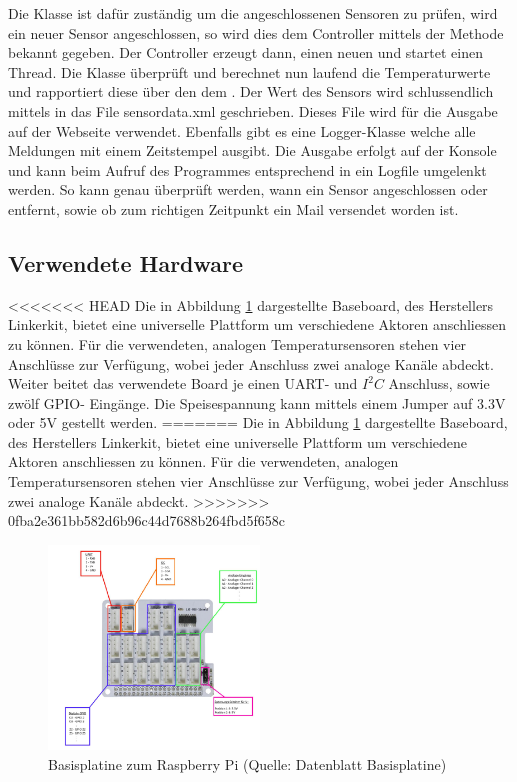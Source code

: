 Die Klasse  ist dafür zuständig um die angeschlossenen Sensoren zu prüfen, wird ein neuer Sensor angeschlossen, so wird dies dem Controller mittels der Methode  bekannt gegeben. Der Controller erzeugt dann, einen neuen  und startet einen Thread. Die Klasse  überprüft und berechnet nun laufend die Temperaturwerte und rapportiert diese über den  dem . Der Wert des Sensors wird schlussendlich mittels  in das File sensordata.xml geschrieben. Dieses File wird für die Ausgabe auf der Webseite verwendet.
Ebenfalls gibt es eine Logger-Klasse welche alle Meldungen mit einem Zeitstempel ausgibt. Die Ausgabe erfolgt auf der Konsole und kann beim Aufruf des Programmes entsprechend in ein Logfile umgelenkt werden. So kann genau überprüft werden, wann ein Sensor angeschlossen oder entfernt, sowie ob zum richtigen Zeitpunkt ein Mail versendet worden ist. 

\subsection{Verwendete Hardware}

<<<<<<< HEAD
Die in Abbildung \ref{fig:plate} dargestellte Baseboard, des Herstellers Linkerkit, bietet eine universelle Plattform um verschiedene Aktoren anschliessen zu können. Für die verwendeten, analogen Temperatursensoren stehen vier Anschlüsse zur Verfügung, wobei jeder Anschluss zwei analoge Kanäle abdeckt. Weiter beitet das verwendete Board je einen UART- und $I^2C$ Anschluss, sowie zwölf GPIO- Eingänge. Die Speisespannung kann mittels einem Jumper auf 3.3V oder 5V gestellt werden. 
=======
Die in Abbildung \ref{fig:plate} dargestellte Baseboard, des Herstellers Linkerkit, bietet eine universelle Plattform um verschiedene Aktoren anschliessen zu können. Für die verwendeten, analogen Temperatursensoren stehen vier Anschlüsse zur Verfügung, wobei jeder Anschluss zwei analoge Kanäle abdeckt.
>>>>>>> 0fba2e361bb582d6b96c44d7688b264fbd5f658c

\begin{figure}[H]%
\centering
\includegraphics[width=0.5\textwidth]{Images/Basisplatine.png}
\caption{Basisplatine zum Raspberry Pi (Quelle: Datenblatt Basisplatine)}
\label{fig:plate}
\end{figure}

